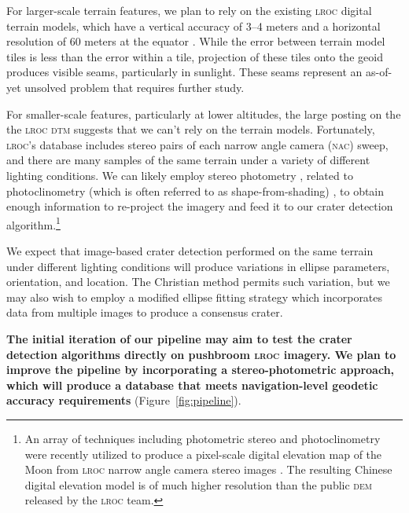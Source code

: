 \documentclass[12pt]{article}
\begin{document}
For larger-scale terrain features, we plan to rely on the existing \textsc{lroc} digital terrain models, which have a vertical accuracy of 3--4 meters and a horizontal resolution of 60 meters at the equator \citep{Barker2016}. While the error between terrain model tiles is less than the error within a tile, projection of these tiles onto the geoid produces visible seams, particularly in sunlight. These seams represent an as-of-yet unsolved problem that requires further study.

For smaller-scale features, particularly at lower altitudes, the large posting on the the \textsc{lroc dtm} suggests that we can't rely on the terrain models. Fortunately, \textsc{lroc}'s database includes stereo pairs of each narrow angle camera (\textsc{nac}) sweep, and there are many samples of the same terrain under a variety of different lighting conditions. We can likely employ stereo photometry \citep{Woodham1980}, related to photoclinometry (which is often referred to as shape-from-shading) \citet{Horn1977,Kirk1987}, to obtain enough information to re-project the imagery and feed it to our crater detection algorithm.\footnote{An array of techniques including photometric stereo and photoclinometry were recently utilized to produce a pixel-scale digital elevation map of the Moon from \textsc{lroc} narrow angle camera stereo images \citep{Liu2020}. The resulting Chinese digital elevation model is of much higher resolution than the public \textsc{dem} released by the \textsc{lroc} team.}

We expect that image-based crater detection performed on the same terrain under different lighting conditions will produce variations in ellipse parameters, orientation, and location. The Christian method permits such variation, but we may also wish to employ a modified ellipse fitting strategy which incorporates data from multiple images to produce a consensus crater.

\textbf{The initial iteration of our pipeline may aim to test the crater detection algorithms directly on pushbroom \textsc{lroc} imagery. We plan to improve the pipeline by incorporating a stereo-photometric approach, which will produce a database that meets navigation-level geodetic accuracy requirements} (Figure~\ref{fig:pipeline}).

\end{document}
